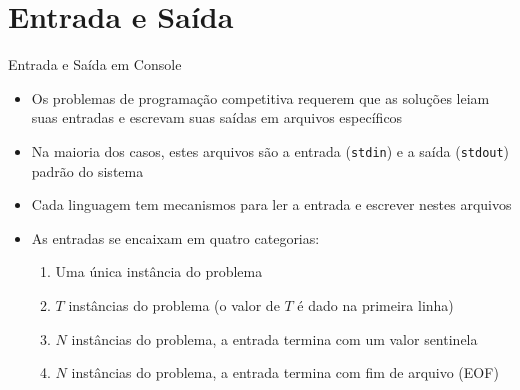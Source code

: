\section{Entrada e Saída}

\begin{frame}[fragile]{Entrada e Saída em Console}

    \begin{itemize}
        \item Os problemas de programação competitiva requerem que as soluções 
        leiam suas entradas e escrevam suas saídas em arquivos específicos
        \item Na maioria dos casos, estes arquivos são a entrada (\texttt{stdin}) e a saída 
            (\texttt{stdout}) padrão do sistema
        \item Cada linguagem tem mecanismos para ler a entrada e escrever nestes arquivos
        \item As entradas se encaixam em quatro categorias:
        \begin{enumerate}
            \item Uma única instância do problema
            \item $T$ instâncias do problema (o valor de $T$ é dado na primeira linha)
            \item $N$ instâncias do problema, a entrada termina com um valor sentinela
            \item $N$ instâncias do problema, a entrada termina com fim de arquivo (EOF)
        \end{enumerate}

    \end{itemize}

\end{frame}

